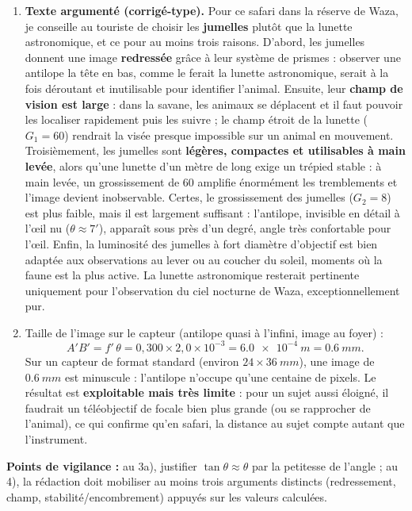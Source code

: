 \documentclass[11pt]{article}
\begin{document}
\begin{corrige}
\begin{enumerate}
\item \textbf{Texte argumenté (corrigé-type).} Pour ce safari dans la réserve de Waza, je conseille au touriste de choisir les \textbf{jumelles} plutôt que la lunette astronomique, et ce pour au moins trois raisons. D'abord, les jumelles donnent une image \textbf{redressée} grâce à leur système de prismes : observer une antilope la tête en bas, comme le ferait la lunette astronomique, serait à la fois déroutant et inutilisable pour identifier l'animal. Ensuite, leur \textbf{champ de vision est large} : dans la savane, les animaux se déplacent et il faut pouvoir les localiser rapidement puis les suivre ; le champ étroit de la lunette ($G_1 = 60$) rendrait la visée presque impossible sur un animal en mouvement. Troisièmement, les jumelles sont \textbf{légères, compactes et utilisables à main levée}, alors qu'une lunette d'un mètre de long exige un trépied stable : à main levée, un grossissement de 60 amplifie énormément les tremblements et l'image devient inobservable. Certes, le grossissement des jumelles ($G_2 = 8$) est plus faible, mais il est largement suffisant : l'antilope, invisible en détail à l'œil nu ($\theta \approx 7'$), apparaît sous près d'un degré, angle très confortable pour l'œil. Enfin, la luminosité des jumelles à fort diamètre d'objectif est bien adaptée aux observations au lever ou au coucher du soleil, moments où la faune est la plus active. La lunette astronomique resterait pertinente uniquement pour l'observation du ciel nocturne de Waza, exceptionnellement pur.
\item Taille de l'image sur le capteur (antilope quasi à l'infini, image au foyer) :
\[ A'B' = f'\,\theta = 0{,}300 \times 2{,}0\times10^{-3} = \SI{6,0e-4}{m} = \SI{0,6}{mm}. \]
Sur un capteur de format standard (environ $24 \times \SI{36}{mm}$), une image de $\SI{0,6}{mm}$ est minuscule : l'antilope n'occupe qu'une centaine de pixels. Le résultat est \textbf{exploitable mais très limite} : pour un sujet aussi éloigné, il faudrait un téléobjectif de focale bien plus grande (ou se rapprocher de l'animal), ce qui confirme qu'en safari, la distance au sujet compte autant que l'instrument.
\end{enumerate}
\textbf{Points de vigilance :} au 3a), justifier $\tan\theta \approx \theta$ par la petitesse de l'angle ; au 4), la rédaction doit mobiliser au moins trois arguments distincts (redressement, champ, stabilité/encombrement) appuyés sur les valeurs calculées.
\end{corrige}

\newpage
\end{document}
